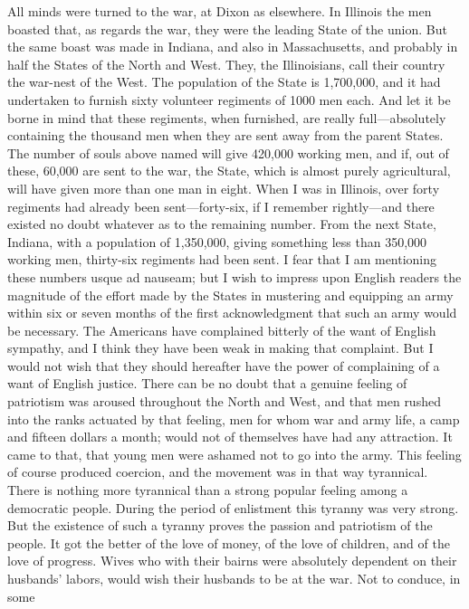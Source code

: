 All minds were turned to the war, at Dixon as elsewhere.  In
Illinois the men boasted that, as regards the war, they were the
leading State of the union.  But the same boast was made in
Indiana, and also in Massachusetts, and probably in half the States
of the North and West.  They, the Illinoisians, call their country
the war-nest of the West.  The population of the State is
1,700,000, and it had undertaken to furnish sixty volunteer
regiments of 1000 men each.  And let it be borne in mind that these
regiments, when furnished, are really full---absolutely containing
the thousand men when they are sent away from the parent States.
The number of souls above named will give 420,000 working men, and
if, out of these, 60,000 are sent to the war, the State, which is
almost purely agricultural, will have given more than one man in
eight.  When I was in Illinois, over forty regiments had already
been sent---forty-six, if I remember rightly---and there existed no
doubt whatever as to the remaining number.  From the next State,
Indiana, with a population of 1,350,000, giving something less than
350,000 working men, thirty-six regiments had been sent.  I fear
that I am mentioning these numbers usque ad nauseam; but I wish to
impress upon English readers the magnitude of the effort made by
the States in mustering and equipping an army within six or seven
months of the first acknowledgment that such an army would be
necessary.  The Americans have complained bitterly of the want of
English sympathy, and I think they have been weak in making that
complaint.  But I would not wish that they should hereafter have
the power of complaining of a want of English justice.  There can
be no doubt that a genuine feeling of patriotism was aroused
throughout the North and West, and that men rushed into the ranks
actuated by that feeling, men for whom war and army life, a camp
and fifteen dollars a month; would not of themselves have had any
attraction.  It came to that, that young men were ashamed not to go
into the army.  This feeling of course produced coercion, and the
movement was in that way tyrannical.  There is nothing more
tyrannical than a strong popular feeling among a democratic people.
During the period of enlistment this tyranny was very strong.  But
the existence of such a tyranny proves the passion and patriotism
of the people.  It got the better of the love of money, of the love
of children, and of the love of progress.  Wives who with their
bairns were absolutely dependent on their husbands' labors, would
wish their husbands to be at the war.  Not to conduce, in some
